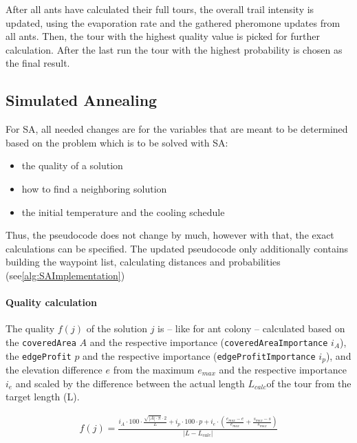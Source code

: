 After all ants have calculated their full tours, the overall trail intensity is updated, using the evaporation rate and the gathered pheromone updates from all ants. 
Then, the tour with the highest quality value is picked for further calculation. 
After the last run the tour with the highest probability is chosen as the final result.



\subsection{Simulated Annealing}
\label{subsec:simulatedAnnealingImplementation}

For SA, all needed changes are for the variables that are meant to be determined based on the problem which is to be solved with SA:
\begin{itemize}
	\item the quality of a solution
	\item how to find a neighboring solution
	\item the initial temperature and the cooling schedule
\end{itemize} 

Thus, the pseudocode does not change by much, however with that, the exact calculations can be specified. 
The updated pseudocode only additionally contains building the waypoint list, calculating distances and probabilities (see\ref{alg:SAImplementation})

\paragraph{Quality calculation}

The quality $f(j)$ of the solution $j$ is -- like for ant colony -- calculated based on the \texttt{coveredArea} $A$ and the respective importance (\texttt{coveredAreaImportance} $i_A$), the \texttt{edgeProfit} $p$ and the respective importance (\texttt{edgeProfitImportance} $i_p$), and the elevation difference $e$ from the maximum $e_{max}$ and the respective importance $i_e$ and scaled by the difference between the actual length $L_{calc}$of the tour from the target length (L). 

\begin{equation}
	\label{eq:qualitySA}
	\begin{split}
		f(j) = \frac{i_A \cdot 100 \cdot \frac{\sqrt{|A|\cdot \pi} \cdot 2 }{L} 
		+  i_p \cdot 100 \cdot p
		+ i_e \cdot \left(\frac{e_{max} - e}{e_{max}} + \frac{s_{max} - s}{s_{max}}\right)}{\left| L - L_{calc} \right|}
	\end{split}
\end{equation}

